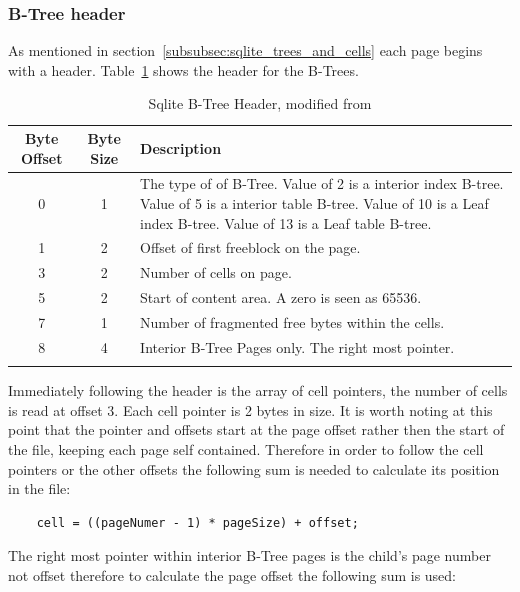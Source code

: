 \subsubsection{B-Tree header}
\label{subsubsec:btree_header}

As mentioned in section~\ref{subsubsec:sqlite_trees_and_cells} each page begins with a header. Table~\ref{tbl:btree_header} shows the header for the B-Trees.

\begin{longtable}[h]{| c | c | p{10cm} |}
		\hline
			\textbf{Byte Offset} & \textbf{Byte Size} & \textbf{Description} \\ 
		\hline
		\endhead
			0 & 1 & The type of of B-Tree. \newline
			Value of 2 is a interior index B-tree. \newline
			Value of 5 is a interior table B-tree. \newline
			Value of 10 is a Leaf index B-tree. \newline
			Value of 13 is a Leaf table B-tree. \\
		\hline
			1 & 2 & Offset of first freeblock on the page. \\
		\hline
			3 & 2 & Number of cells on page. \\
		\hline
			5 & 2 & Start of content area. A zero is seen as 65536. \\
		\hline
			7 & 1 & Number of fragmented free bytes within the cells. \\
		\hline
			8 & 4 & Interior B-Tree Pages only. The right most pointer. \\ 
		\hline
	\caption{Sqlite B-Tree Header, modified from \cite{sqlite}}
	\label{tbl:btree_header}
\end{longtable}

Immediately following the header is the array of cell pointers, the number of cells is read at offset 3. Each cell pointer is 2 bytes in size. It is worth noting at this point that the pointer and offsets start at the page offset rather then the start of the file, keeping each page self contained. Therefore in order to follow the cell pointers or the other offsets the following sum is needed to calculate its position in the file: 

\begin{lstlisting}	
	cell = ((pageNumer - 1) * pageSize) + offset;
\end{lstlisting}

The right most pointer within interior B-Tree pages is the child’s page number not offset therefore to calculate the page offset the following sum is used:

